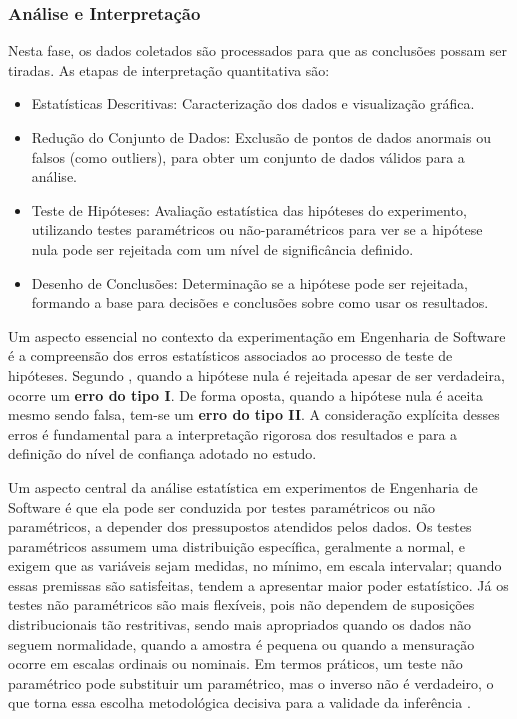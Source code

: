 \subsubsection{Análise e Interpretação}
Nesta fase, os dados coletados são processados para que as conclusões possam ser tiradas.
As etapas de interpretação quantitativa são:
\begin{itemize}
    \item Estatísticas Descritivas: Caracterização dos dados e visualização gráfica.
    \item Redução do Conjunto de Dados: Exclusão de pontos de dados anormais ou falsos (como outliers), para obter um conjunto de dados válidos para a análise.
    \item Teste de Hipóteses: Avaliação estatística das hipóteses do experimento, utilizando testes paramétricos ou não-paramétricos para ver se a 
	hipótese nula pode ser rejeitada com um nível de significância definido.
    \item Desenho de Conclusões: Determinação se a hipótese pode ser 
	rejeitada, formando a base para decisões e conclusões sobre como usar os resultados.
\end{itemize}

Um aspecto essencial no contexto da experimentação em Engenharia de Software é a compreensão dos erros estatísticos associados 
ao processo de teste de hipóteses. Segundo , quando a hipótese nula é rejeitada apesar de ser 
verdadeira, ocorre um \textbf{erro do tipo I}. De forma oposta, quando a hipótese nula é aceita mesmo sendo falsa, tem-se um \textbf{erro do tipo II}. 
A consideração explícita desses erros é fundamental para a interpretação rigorosa dos resultados e para a definição do nível de confiança adotado no estudo.

Um aspecto central da análise estatística em experimentos de Engenharia de Software é que ela pode ser conduzida por testes paramétricos ou não paramétricos, a depender dos pressupostos atendidos pelos dados. Os testes paramétricos assumem uma distribuição específica, geralmente a normal, e exigem que as variáveis sejam medidas, no mínimo, em escala intervalar; quando essas premissas são satisfeitas, tendem a apresentar maior poder estatístico. Já os testes não paramétricos são mais flexíveis, pois não dependem de suposições distribucionais tão restritivas, sendo mais apropriados quando os dados não seguem normalidade, quando a amostra é pequena ou quando a mensuração ocorre em escalas ordinais ou nominais. Em termos práticos, um teste não paramétrico pode substituir um paramétrico, mas o inverso não é verdadeiro, o que torna essa escolha metodológica decisiva para a validade da inferência \cite{Wohlin:2012:ESE:2349018,conover1999practical}.

